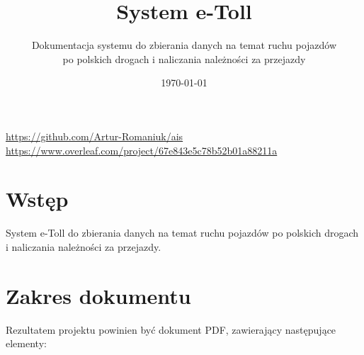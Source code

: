 \documentclass[12pt]{article}
\title{System e-Toll}
\author{Dokumentacja systemu do zbierania danych na temat ruchu pojazdów\\po polskich drogach i naliczania należności za przejazdy}
\date{\today}
\begin{document}
\maketitle

\begin{center}
\url{https://github.com/Artur-Romaniuk/ais}\\
\url{https://www.overleaf.com/project/67e843e5c78b52b01a88211a}
\end{center}

\section*{Wstęp}
System e-Toll do zbierania danych na temat ruchu pojazdów po polskich drogach i naliczania należności za przejazdy.

\section*{Zakres dokumentu}
Rezultatem projektu powinien być dokument PDF, zawierający następujące elementy:
\end{document}
